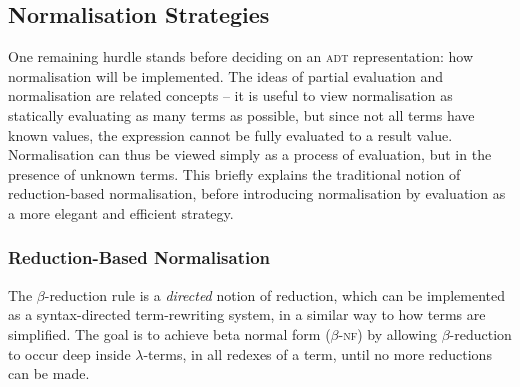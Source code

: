 \documentclass[../../../main.tex]{subfiles}
\begin{document}
\subsection{Normalisation Strategies}\label{sec:normalisation-approach}
One remaining hurdle stands before deciding on an \textsc{adt} representation: how normalisation will be implemented.
The ideas of partial evaluation and normalisation are related concepts -- it is useful to view normalisation as statically evaluating as many terms as possible, but since not all terms have known values, the expression cannot be fully evaluated to a result value.
Normalisation can thus be viewed simply as a process of evaluation, but in the presence of unknown terms.
This  briefly explains the traditional notion of reduction-based normalisation, before introducing normalisation by evaluation as a more elegant and efficient strategy.


\subsubsection{Reduction-Based Normalisation}
The $\beta$-reduction rule is a \emph{directed} notion of reduction, which can be implemented as a syntax-directed term-rewriting system, in a similar way to how  terms are simplified.
The goal is to achieve beta normal form ($\beta$-\textsc{nf}) by allowing $\beta$-reduction to occur deep inside $\lambda$-terms, in all redexes of a term, until no more reductions can be made.
\end{document}

